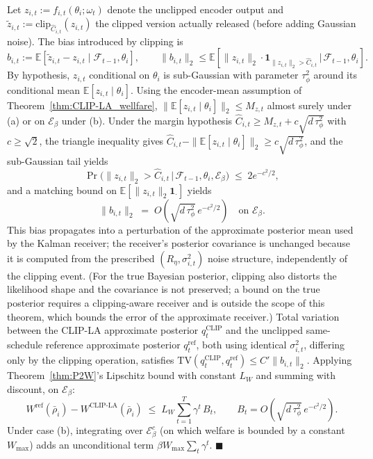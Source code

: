\documentclass{article}
\begin{document}
Let $z_{i,t} := f_{i,t}(\theta_i; \omega_t)$ denote the unclipped encoder output and $\tilde z_{i,t} := \mathrm{clip}_{\hat C_{i,t}}(z_{i,t})$ the clipped version actually released (before adding Gaussian noise). The bias introduced by clipping is
$$b_{i,t} := \mathbb{E}[\tilde z_{i,t} - z_{i,t} \mid \mathcal{F}_{t-1}, \theta_i], \qquad \|b_{i,t}\|_2 \le \mathbb{E}\!\left[\|z_{i,t}\|_2 \cdot \mathbf{1}_{\|z_{i,t}\|_2 > \hat C_{i,t}} \,\big|\, \mathcal{F}_{t-1}, \theta_i\right].$$
By hypothesis, $z_{i,t}$ conditional on $\theta_i$ is sub-Gaussian with parameter $\tau_\phi^2$ around its conditional mean $\mathbb{E}[z_{i,t}\mid\theta_i]$. Using the encoder-mean assumption of Theorem~\ref{thm:CLIP-LA_wellfare}, $\|\mathbb{E}[z_{i,t}\mid\theta_i]\|_2 \le M_{z,t}$ almost surely under (a) or on $\mathcal{E}_\beta$ under (b). Under the margin hypothesis $\hat C_{i,t} \ge M_{z,t} + c\sqrt{d\,\tau_\phi^2}$ with $c \ge \sqrt{2}$, the triangle inequality gives $\hat C_{i,t} - \|\mathbb{E}[z_{i,t}\mid\theta_i]\|_2 \ge c\sqrt{d\,\tau_\phi^2}$, and the sub-Gaussian tail yields
$$\Pr\!\big(\|z_{i,t}\|_2 > \hat C_{i,t} \,\big|\, \mathcal{F}_{t-1}, \theta_i, \mathcal{E}_\beta\big) \;\le\; 2 e^{-c^2/2},$$
and a matching bound on $\mathbb{E}[\|z_{i,t}\|_2 \mathbf{1}_{\cdot}]$ yields
$$\|b_{i,t}\|_2 \;=\; O\!\left(\sqrt{d\,\tau_\phi^2}\, e^{-c^2/2}\right) \quad \text{on } \mathcal{E}_\beta.$$
This bias propagates into a perturbation of the approximate posterior mean used by the Kalman receiver; the receiver's posterior covariance is unchanged because it is computed from the prescribed $(R_\eta, \sigma_{i,t}^2)$ noise structure, independently of the clipping event. (For the true Bayesian posterior, clipping also distorts the likelihood shape and the covariance is not preserved; a bound on the true posterior requires a clipping-aware receiver and is outside the scope of this theorem, which bounds the error of the approximate receiver.) Total variation between the CLIP-LA approximate posterior $q_t^{\mathrm{CLIP}}$ and the unclipped same-schedule reference approximate posterior $q_t^{\mathrm{ref}}$, both using identical $\sigma_{i,t}^2$, differing only by the clipping operation, satisfies $\mathrm{TV}(q_t^{\mathrm{CLIP}}, q_t^{\mathrm{ref}}) \le C'\|b_{i,t}\|_2$. Applying Theorem~\ref{thm:P2W}'s Lipschitz bound with constant $L_W$ and summing with discount, on $\mathcal{E}_\beta$:
$$W^{\mathrm{ref}}(\bar\rho_i) - W^{\mathrm{CLIP\text{-}LA}}(\bar\rho_i) \;\le\; L_W \sum_{t=1}^T \gamma^t\, B_t, \qquad B_t = O\!\left(\sqrt{d\,\tau_\phi^2}\, e^{-c^2/2}\right).$$
Under case (b), integrating over $\mathcal{E}_\beta^c$ (on which welfare is bounded by a constant $W_{\max}$) adds an unconditional term $\beta W_{\max} \sum_t \gamma^t$. $\blacksquare$
\end{document}
